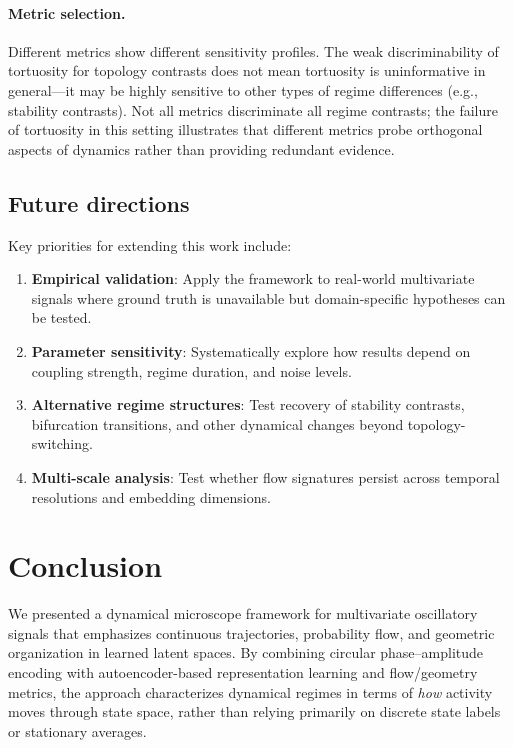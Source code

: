 \documentclass[5p,twocolumn,authoryear]{elsarticle}
\begin{document}
\paragraph{Metric selection.}
Different metrics show different sensitivity profiles. The weak discriminability of tortuosity for topology contrasts does not mean tortuosity is uninformative in general---it may be highly sensitive to other types of regime differences (e.g., stability contrasts). Not all metrics discriminate all regime contrasts; the failure of tortuosity in this setting illustrates that different metrics probe orthogonal aspects of dynamics rather than providing redundant evidence.

\subsection{Future directions}

Key priorities for extending this work include:
\begin{enumerate}
    \item \textbf{Empirical validation}: Apply the framework to real-world multivariate signals where ground truth is unavailable but domain-specific hypotheses can be tested.
    \item \textbf{Parameter sensitivity}: Systematically explore how results depend on coupling strength, regime duration, and noise levels.
    \item \textbf{Alternative regime structures}: Test recovery of stability contrasts, bifurcation transitions, and other dynamical changes beyond topology-switching.
    \item \textbf{Multi-scale analysis}: Test whether flow signatures persist across temporal resolutions and embedding dimensions.
\end{enumerate}

\section{Conclusion}
\label{sec:conclusion}

We presented a dynamical microscope framework for multivariate oscillatory signals that emphasizes continuous trajectories, probability flow, and geometric organization in learned latent spaces. By combining circular phase--amplitude encoding with autoencoder-based representation learning and flow/geometry metrics, the approach characterizes dynamical regimes in terms of \emph{how} activity moves through state space, rather than relying primarily on discrete state labels or stationary averages.
\end{document}
